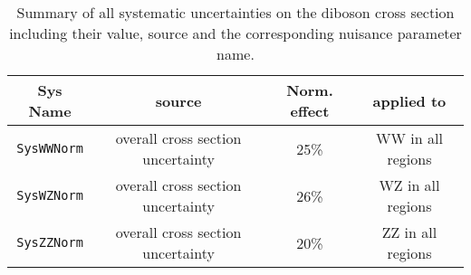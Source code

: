 \begin{table}[!htbp]\captionsetup{justification=centering}
\small
\centering
\begin{tabular}{ c || c | c | c  }
\hline
\hline
Sys Name  & source & Norm. effect & applied to \\
\hline
\texttt{SysWWNorm} 		&  overall cross section uncertainty	&  25\% 	& WW in all regions 	\\
\hline	
\texttt{SysWZNorm} 			&  overall cross section uncertainty	&  26\% 	& WZ in all regions 	\\
\hline
\texttt{SysZZNorm} 			&  overall cross section uncertainty	&  20\% 	& ZZ in all regions 	\\
\hline
\hline
\end{tabular}
\caption{Summary of all systematic uncertainties on the diboson cross section including their value, source and the corresponding nuisance parameter name. } 
\label{tab:DibOverall}
\end{table}


